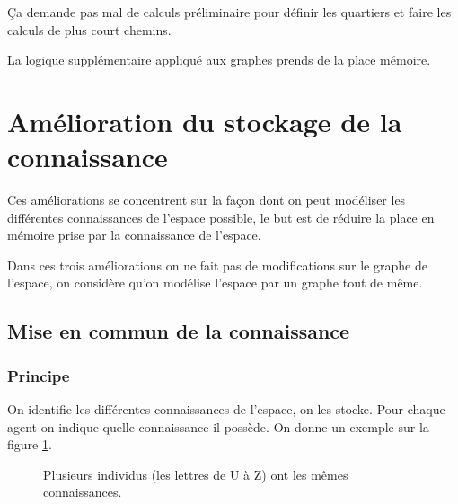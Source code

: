 \documentclass[a4paper]{article}
\begin{document}
Ça demande pas mal de calculs préliminaire pour définir les quartiers et
faire les calculs de plus court chemins.

La logique supplémentaire appliqué aux graphes prends de la place mémoire.

\section{Amélioration du stockage de la connaissance}

Ces améliorations se concentrent sur la façon dont on peut modéliser les
différentes connaissances de l'espace possible, le but est de réduire la place
en mémoire prise par la connaissance de l'espace.

Dans ces trois améliorations on ne fait pas de modifications sur le graphe de
l'espace, on considère qu'on modélise l'espace par un graphe tout de même.

  \subsection{Mise en commun de la connaissance}
  \label{sec:miseEnCommun}

    \subsubsection{Principe}

On identifie les différentes connaissances de l'espace, on les stocke. Pour
chaque agent on indique quelle connaissance il possède. On donne un exemple sur
la figure \ref{fig:miseEnCommun}.

\begin{figure}%
  \caption{Plusieurs individus (les lettres de U à Z) ont les mêmes
  connaissances.}
  \label{fig:miseEnCommun}
\end{figure}%
\end{document}
